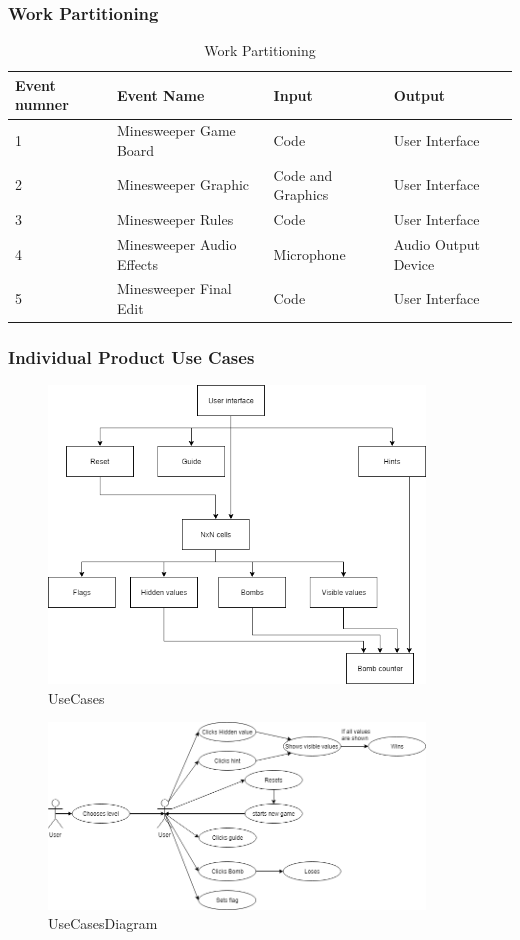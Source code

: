 \documentclass[10pt]{article}
\begin{document}
\subsubsection{Work Partitioning}
\begin{table}[h!]
    \caption{Work Partitioning}
    \begin{center}
	\begin{tabular}{|p{2.0cm}|p{2.0cm}|p{3.0cm}|p{2.5cm}|}
	\hline
	\textbf{Event numner} & \textbf{Event Name} & \textbf{Input} & \textbf{Output}\\
	\hline
      1 & Minesweeper Game Board & Code & User Interface\\
      \hline
      2 & Minesweeper Graphic & Code and Graphics & User Interface \\
      \hline
      3 & Minesweeper Rules & Code & User Interface\\
      \hline
      4 & Minesweeper Audio Effects &  Microphone & Audio Output Device\\
      \hline
      5 & Minesweeper Final Edit & Code & User Interface \\
      \hline
	\end{tabular}
    \end{center}
	\end{table}
\newpage
\subsubsection{Individual Product Use Cases}
    \begin{figure}[ht!]
    \centering
    \includegraphics[width=100mm]{UseCases.png}
    \caption{UseCases}
    \label{fig1:Use Cases}
    \end{figure}
    \begin{figure}[ht!]
    \centering
    \includegraphics[width=100mm]{UseCasesDiagram.png}
    \caption{UseCasesDiagram}
    \label{fig1:Use Cases}
    \end{figure}
    
\end{document}
